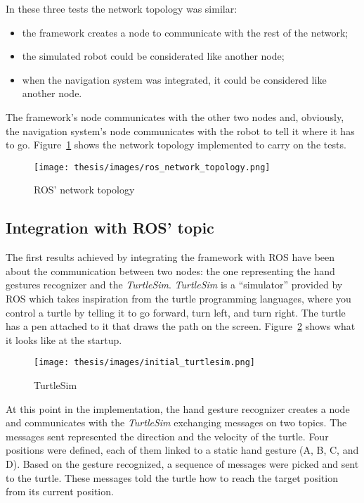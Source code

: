 \documentclass[../thesis.tex]{subfiles}
\begin{document}
In these three tests the network topology was similar:
\begin{itemize}
    \item the framework creates a node to communicate with the rest of the network;
    \item the simulated robot could be considerated like another node;
    \item when the navigation system was integrated, it could be considered like another node.
\end{itemize}

The framework's node communicates with the other two nodes and, obviously, the navigation system's node communicates with the robot to tell it where it has to go. Figure~\ref{fig:ros_network_topology} shows the network topology implemented to carry on the tests.

\begin{figure}[H]
    \centering
    \texttt{[image: thesis/images/ros\_network\_topology.png]}
    \caption{ROS' network topology}
    \label{fig:ros_network_topology}
\end{figure}

\subsection{Integration with ROS' topic}
The first results achieved by integrating the framework with \gls{ROS} have been about the communication between two nodes: the one representing the hand gestures recognizer and the \textit{TurtleSim}. \textit{TurtleSim} is a ``simulator'' provided by \gls{ROS} which takes inspiration from the turtle programming languages, where you control a turtle by telling it to go forward, turn left, and turn right. The turtle has a pen attached to it that draws the path on the screen. Figure~\ref{fig:initial_turtlesim} shows what it looks like at the startup.

\begin{figure}[H]
    \centering
    \texttt{[image: thesis/images/initial\_turtlesim.png]}
    \caption{TurtleSim}
    \label{fig:initial_turtlesim}
\end{figure}

At this point in the implementation, the hand gesture recognizer creates a node and communicates with the \textit{TurtleSim} exchanging messages on two topics. The messages sent represented the direction and the velocity of the turtle. Four positions were defined, each of them linked to a static hand gesture (A, B, C, and D). Based on the gesture recognized, a sequence of messages were picked and sent to the turtle. These messages told the turtle how to reach the target position from its current position.
\end{document}
